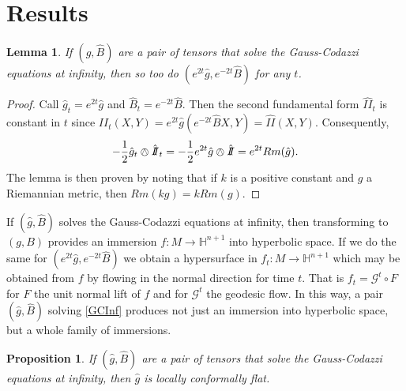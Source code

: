 \documentclass{amsart}
\newcommand{\two}{I\!\!I}
\newtheorem{lem}[thm]{Lemma}
\newtheorem{prop}[thm]{Proposition}
\numberwithin{equation}{section}
\renewcommand{\H}{\mathbb{H}}
\begin{document}
\section{Results}

\begin{lem}
\label{scalings}
If $(\hat{g},\hat{B})$ are a pair of tensors that solve the Gauss-Codazzi equations at infinity, then so too do $(e^{2t}\hat{g},e^{-2t}\hat{B})$ for any $t$. 
\end{lem}

\begin{proof}
Call $\hat{g}_t = e^{2t}\hat{g}$ and $\hat{B}_t = e^{-2t}\hat{B}$.
Then the second fundamental form $\hat{\two}_t$ is constant in $t$ since $\hat{\two}_t(X,Y) = e^{2t}\hat{g}(e^{-2t}\hat{B}X,Y) = \hat{\two}(X,Y)$.
Consequently, 
\[
-\frac{1}{2}\hat{g}_t \owedge \hat{\two}_t 
= -\frac{1}{2}e^{2t}\hat{g}\owedge \hat{\two} 
= e^{2t}Rm(\hat{g}).
\]
The lemma is then proven by noting that if $k$ is a positive constant and $g$ a Riemannian metric, then $Rm(kg) = kRm(g)$.
\end{proof}

If $(\hat{g},\hat{B})$ solves the Gauss-Codazzi equations at infinity, then transforming to $(g,B)$ provides an immersion $f: M \to \H^{n+1}$ into hyperbolic space.
If we do the same for $(e^{2t}\hat{g},e^{-2t}\hat{B})$ we obtain a hypersurface in $f_t: M \to \H^{n+1}$ which may be obtained from $f$ by flowing in the normal direction for time $t$.
That is $f_t  = \mathcal{G}^t \circ F$ for $F$ the unit normal lift of $f$ and for $\mathcal{G}^t$ the geodesic flow. 
In this way, a pair $(\hat{g},\hat{B})$ solving \ref{GCInf} produces not just an immersion into hyperbolic space, but a whole family of immersions.

\begin{prop}
\label{GCInf-LCF}
If $(\hat{g},\hat{B})$ are a pair of tensors that solve the Gauss-Codazzi equations at infinity, then $\hat{g}$ is locally conformally flat. 
\end{prop}
\end{document}
